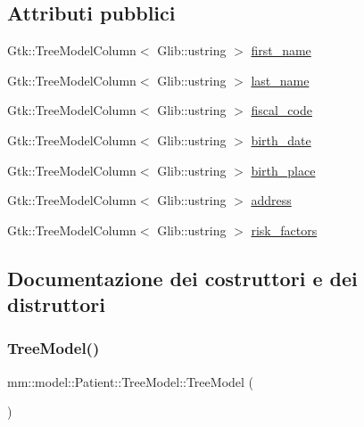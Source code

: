 \subsection*{Attributi pubblici}
\begin{DoxyCompactItemize}
\item 
Gtk\+::\+Tree\+Model\+Column$<$ Glib\+::ustring $>$ \mbox{\hyperlink{structmm_1_1model_1_1_patient_1_1_tree_model_adf28688b198a38740eaff550b3c2c1fb}{first\+\_\+name}}
\item 
Gtk\+::\+Tree\+Model\+Column$<$ Glib\+::ustring $>$ \mbox{\hyperlink{structmm_1_1model_1_1_patient_1_1_tree_model_a0ed75cd3b4f8d2378abe0de229e4c052}{last\+\_\+name}}
\item 
Gtk\+::\+Tree\+Model\+Column$<$ Glib\+::ustring $>$ \mbox{\hyperlink{structmm_1_1model_1_1_patient_1_1_tree_model_aa2fecd995942eb8662bda71300bb6ae9}{fiscal\+\_\+code}}
\item 
Gtk\+::\+Tree\+Model\+Column$<$ Glib\+::ustring $>$ \mbox{\hyperlink{structmm_1_1model_1_1_patient_1_1_tree_model_ac1420b4e9a91af21da1bb6be8dd73c9b}{birth\+\_\+date}}
\item 
Gtk\+::\+Tree\+Model\+Column$<$ Glib\+::ustring $>$ \mbox{\hyperlink{structmm_1_1model_1_1_patient_1_1_tree_model_a9c168aebc887200f36b69740e73b3067}{birth\+\_\+place}}
\item 
Gtk\+::\+Tree\+Model\+Column$<$ Glib\+::ustring $>$ \mbox{\hyperlink{structmm_1_1model_1_1_patient_1_1_tree_model_a32f489915cba3373fa445c35d7137192}{address}}
\item 
Gtk\+::\+Tree\+Model\+Column$<$ Glib\+::ustring $>$ \mbox{\hyperlink{structmm_1_1model_1_1_patient_1_1_tree_model_a3acdb3bd280b1f59d8d94f5d2806db21}{risk\+\_\+factors}}
\end{DoxyCompactItemize}


\subsection{Documentazione dei costruttori e dei distruttori}
\mbox{\label{structmm_1_1model_1_1_patient_1_1_tree_model_a53ebc678daee18b03328be60d1c69bf4}} 
\subsubsection{\texorpdfstring{Tree\+Model()}{TreeModel()}}
{\footnotesize\ttfamily mm\+::model\+::\+Patient\+::\+Tree\+Model\+::\+Tree\+Model (\begin{DoxyParamCaption}{ }\end{DoxyParamCaption})\hspace{0.3cm}{\ttfamily [noexcept]}}



